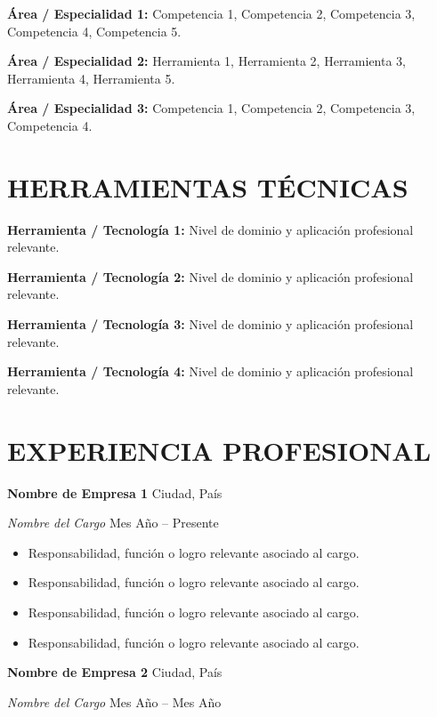 \documentclass[10pt,a4paper]{article}
\newcommand{\entidad}[2]{%
    \noindent
    \textbf{#1}\hfill
    {\small\color{secundario}#2}\par
}
\newcommand{\cargo}[2]{%
    \noindent
    \textit{#1}\hfill
    {\small\color{secundario}#2}\par
}
\newcommand{\detalle}[2]{%
    \noindent
    \textbf{#1} #2\par
    \vspace{2pt}
}
\begin{document}
\detalle{Área / Especialidad 1:}{
    Competencia 1, Competencia 2, Competencia 3,
    Competencia 4, Competencia 5.
}

\detalle{Área / Especialidad 2:}{
    Herramienta 1, Herramienta 2, Herramienta 3,
    Herramienta 4, Herramienta 5.
}

\detalle{Área / Especialidad 3:}{
    Competencia 1, Competencia 2, Competencia 3, Competencia 4.
}

\section{HERRAMIENTAS TÉCNICAS}

\detalle{Herramienta / Tecnología 1:}{
    Nivel de dominio y aplicación profesional relevante.
}

\detalle{Herramienta / Tecnología 2:}{
    Nivel de dominio y aplicación profesional relevante.
}

\detalle{Herramienta / Tecnología 3:}{
    Nivel de dominio y aplicación profesional relevante.
}

\detalle{Herramienta / Tecnología 4:}{
    Nivel de dominio y aplicación profesional relevante.
}

\section{EXPERIENCIA PROFESIONAL}

\entidad{Nombre de Empresa 1}{Ciudad, País}
\cargo{Nombre del Cargo}{Mes Año -- Presente}

\begin{itemize}
    \item Responsabilidad, función o logro relevante asociado al cargo.
    \item Responsabilidad, función o logro relevante asociado al cargo.
    \item Responsabilidad, función o logro relevante asociado al cargo.
    \item Responsabilidad, función o logro relevante asociado al cargo.
\end{itemize}

\vspace{3pt}

\entidad{Nombre de Empresa 2}{Ciudad, País}
\cargo{Nombre del Cargo}{Mes Año -- Mes Año}
\end{document}
